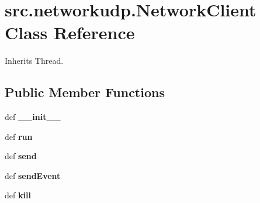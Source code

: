 \hypertarget{classsrc_1_1networkudp_1_1_network_client}{\section{src.\-networkudp.\-Network\-Client \-Class \-Reference}
\label{classsrc_1_1networkudp_1_1_network_client}
}


\-Inherits \-Thread.

\subsection*{\-Public \-Member \-Functions}
\begin{DoxyCompactItemize}
\item 
\hypertarget{classsrc_1_1networkudp_1_1_network_client_abe9fe8fe46d45e30b519fb0e1d16faa9}{def {\bfseries \-\_\-\-\_\-init\-\_\-\-\_\-}}\label{classsrc_1_1networkudp_1_1_network_client_abe9fe8fe46d45e30b519fb0e1d16faa9}

\item 
\hypertarget{classsrc_1_1networkudp_1_1_network_client_a08ebad14c71ee0d7a73501aff99142b4}{def {\bfseries run}}\label{classsrc_1_1networkudp_1_1_network_client_a08ebad14c71ee0d7a73501aff99142b4}

\item 
\hypertarget{classsrc_1_1networkudp_1_1_network_client_ae0018e9d9462def5211cf5aa271f7d9f}{def {\bfseries send}}\label{classsrc_1_1networkudp_1_1_network_client_ae0018e9d9462def5211cf5aa271f7d9f}

\item 
\hypertarget{classsrc_1_1networkudp_1_1_network_client_a0e7b0d0224cddb634e918ebb93528894}{def {\bfseries send\-Event}}\label{classsrc_1_1networkudp_1_1_network_client_a0e7b0d0224cddb634e918ebb93528894}

\item 
\hypertarget{classsrc_1_1networkudp_1_1_network_client_a87d3503b0121876d04ad86d577bc5fb0}{def {\bfseries kill}}\label{classsrc_1_1networkudp_1_1_network_client_a87d3503b0121876d04ad86d577bc5fb0}

\end{DoxyCompactItemize}

